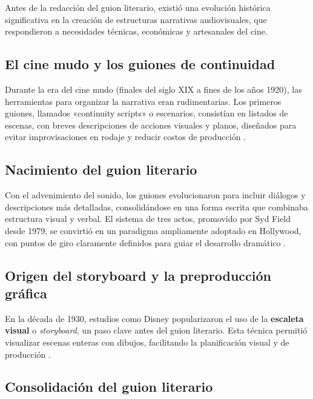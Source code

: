 \documentclass[12pt]{article}
\begin{document}
	\hspace{1.27cm}Antes de la redacción del guion literario, existió una evolución histórica significativa en la creación de estructuras narrativas audiovisuales, que respondieron a necesidades técnicas, económicas y artesanales del cine.

	\subsection{El cine mudo y los guiones de continuidad}

	\hspace{1.27cm}Durante la era del cine mudo (finales del siglo XIX a fines de los años 1920), las herramientas para organizar la narrativa eran rudimentarias. Los primeros guiones, llamados «continuity scripts» o escenarios, consistían en listados de escenas, con breves descripciones de acciones visuales y planos, diseñados para evitar improvisaciones en rodaje y reducir costos de producción \parencite{screenplayology_history}.

	\subsection{Nacimiento del guion literario}

	\hspace{1.27cm}Con el advenimiento del sonido, los guiones evolucionaron para incluir diálogos y descripciones más detalladas, consolidándose en una forma escrita que combinaba estructura visual y verbal. El sistema de tres actos, promovido por Syd Field desde 1979, se convirtió en un paradigma ampliamente adoptado en Hollywood, con puntos de giro claramente definidos para guiar el desarrollo dramático \parencite{newyorker_mckee,newyorker_mckee2}.

	\subsection{Origen del storyboard y la preproducción gráfica}

	\hspace{1.27cm}En la década de 1930, estudios como Disney popularizaron el uso de la \textbf{escaleta visual} o \textit{storyboard}, un paso clave antes del guion literario. Esta técnica permitió visualizar escenas enteras con dibujos, facilitando la planificación visual y de producción \parencite{storyboard_wikipedia}.

	\subsection{Consolidación del guion literario}
\end{document}
